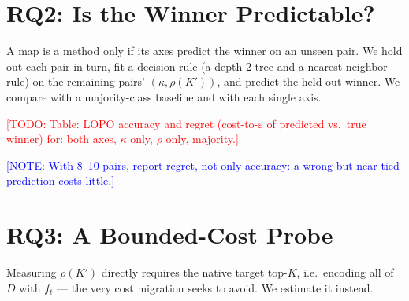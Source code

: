 \documentclass[conference]{IEEEtran}
\newcommand{\todo}[1]{\textcolor{red}{[TODO: #1]}}
\newcommand{\note}[1]{\textcolor{blue}{[NOTE: #1]}}
\begin{document}
\section{RQ2: Is the Winner Predictable?}\label{sec:rq2}

A map is a method only if its axes predict the winner on an unseen pair. We hold out
each pair in turn, fit a decision rule (a depth-2 tree and a nearest-neighbor rule) on
the remaining pairs' $(\kappa, \rho(K'))$, and predict the held-out winner. We compare
with a majority-class baseline and with each single axis.

\todo{Table: LOPO accuracy and regret (cost-to-$\varepsilon$ of predicted vs.\ true
winner) for: both axes, $\kappa$ only, $\rho$ only, majority.}

\note{With 8--10 pairs, report regret, not only accuracy: a wrong but near-tied
prediction costs little.}

\section{RQ3: A Bounded-Cost Probe}\label{sec:rq3}

Measuring $\rho(K')$ directly requires the native target top-$K$, i.e.\ encoding all of
$D$ with $f_t$ --- the very cost migration seeks to avoid. We estimate it instead.
\end{document}
